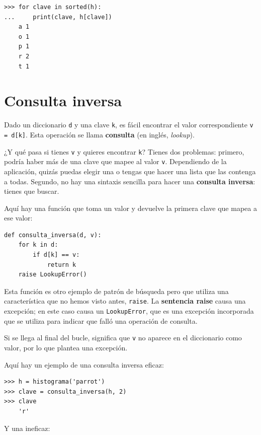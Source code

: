 \documentclass[10pt]{book}
\begin{document}
\begin{verbatim}
>>> for clave in sorted(h):
...     print(clave, h[clave])
    a 1
    o 1
    p 1
    r 2
    t 1
\end{verbatim}



\section{Consulta inversa}
\label{raise}

Dado un diccionario {\tt d} y una clave {\tt k}, es fácil
encontrar el valor correspondiente {\tt v = d[k]}.  Esta operación
se llama {\bf consulta} (en inglés, {\em lookup}).

¿Y qué pasa si tienes {\tt v} y quieres encontrar {\tt k}?
Tienes dos problemas: primero, podría haber más de una
clave que mapee al valor {\tt v}.  Dependiendo de la aplicación,
quizás puedas elegir una o tengas que hacer
una lista que las contenga a todas.  Segundo, no hay
una sintaxis sencilla para hacer una {\bf consulta inversa}: tienes que buscar.

Aquí hay una función que toma un valor y devuelve la primera
clave que mapea a ese valor:

\begin{verbatim}
def consulta_inversa(d, v):
    for k in d:
        if d[k] == v:
            return k
    raise LookupError()
\end{verbatim}
%
Esta función es otro ejemplo de patrón de búsqueda pero que
utiliza una característica que no hemos visto antes, {\tt raise}.  La
{\bf sentencia raise} causa una excepción; en este caso causa un
{\tt LookupError}, que es una excepción incorporada que se utiliza para indicar
que falló una operación de consulta.
  
 

Si se llega al final del bucle, significa que {\tt v}
no aparece en el diccionario como valor, por lo que plantea una
excepción.

Aquí hay un ejemplo de una consulta inversa eficaz:

\begin{verbatim}
>>> h = histograma('parrot')
>>> clave = consulta_inversa(h, 2)
>>> clave 
    'r'
\end{verbatim}
%
Y una ineficaz:
\end{document}
